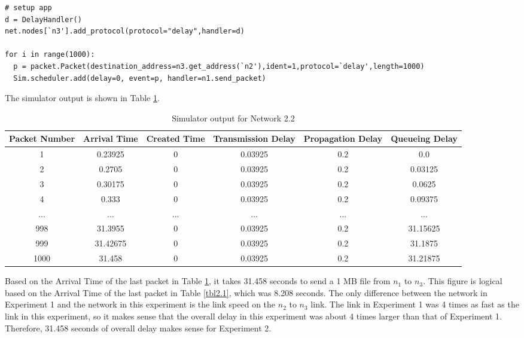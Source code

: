 \documentclass[11pt]{article}
\begin{document}
\begin{description}
\begin{lstlisting}[caption={Network 2.2},label=sec2exp2]
# setup app
d = DelayHandler()
net.nodes[`n3'].add_protocol(protocol="delay",handler=d)

for i in range(1000):
  p = packet.Packet(destination_address=n3.get_address(`n2'),ident=1,protocol=`delay',length=1000)
  Sim.scheduler.add(delay=0, event=p, handler=n1.send_packet)
\end{lstlisting}

The simulator output is shown in Table \ref{tbl2.2}.

\smallskip

\begin{table}[H]
\begin{center}
\caption{Simulator output for Network 2.2}
\label{tbl2.2}
\begin{tabular}{cccccc}
  \toprule
  Packet Number & Arrival Time & Created Time & Transmission Delay & Propagation Delay & Queueing Delay\\
  \midrule
  1 & 0.23925 & 0 & 0.03925 & 0.2 & 0.0\\
  2 & 0.2705 & 0 & 0.03925 & 0.2 & 0.03125\\
  3 & 0.30175 & 0 & 0.03925 & 0.2 & 0.0625\\
  4 & 0.333 & 0 & 0.03925 & 0.2 & 0.09375\\
  ... & ... & ... & ... & ... & ...\\
  998 & 31.3955 & 0 & 0.03925 & 0.2 & 31.15625\\
  999 & 31.42675 & 0 & 0.03925 & 0.2 & 31.1875\\
  1000 & 31.458 & 0 & 0.03925 & 0.2 & 31.21875\\
  \bottomrule
\end{tabular}
\end{center}
\end{table}

\smallskip

Based on the Arrival Time of the last packet in Table \ref{tbl2.2}, it takes 31.458 seconds to send a 1 MB file from $n_1$ to $n_3$. This figure is logical based on the Arrival Time of the last packet in Table \ref{tbl2.1}, which was 8.208 seconds. The only difference between the network in Experiment 1 and the network in this experiment is the link speed on the $n_2$ to $n_3$ link. The link in Experiment 1 was 4 times as fast as the link in this experiment, so it makes sense that the overall delay in this experiment was about 4 times larger than that of Experiment 1. Therefore, 31.458 seconds of overall delay makes sense for Experiment 2.
\end{description}
\end{document}
